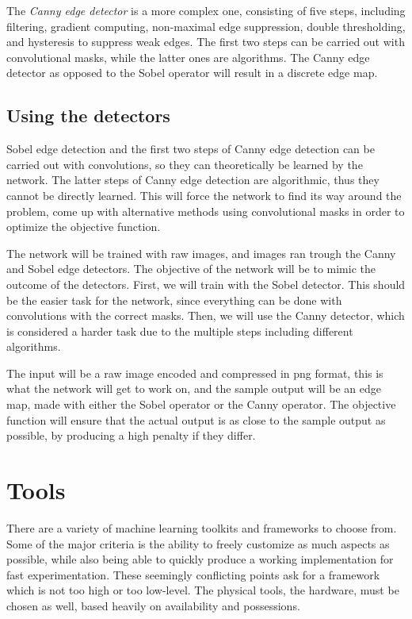 \documentclass[12pt]{report}
\begin{document}
The \textit{Canny edge detector} \cite{canny} is a more complex one, consisting of five steps, including filtering, gradient computing, non-maximal edge suppression, double thresholding, and hysteresis to suppress weak edges. The first two steps can be carried out with convolutional masks, while the latter ones are algorithms. The Canny edge detector as opposed to the Sobel operator will result in a discrete edge map.
\subsection{Using the detectors}
Sobel edge detection and the first two steps of Canny edge detection can be carried out with convolutions, so they can theoretically be learned by the network. The latter steps of Canny edge detection are algorithmic, thus they cannot be directly learned.
This will force the network to find its way around the problem, come up with alternative methods using convolutional masks in order to optimize the objective function.

The network will be trained with raw images, and images ran trough the Canny and Sobel edge detectors. The objective of the network will be to mimic the outcome of the detectors. First, we will train with the Sobel detector. This should be the easier task for the network, since everything can be done with convolutions with the correct masks. Then, we will use the Canny detector, which is considered a harder task due to the multiple steps including different algorithms.

The input will be a raw image encoded and compressed in png format, this is what the network will get to work on, and the sample output will be an edge map, made with either the Sobel operator or the Canny operator. The objective function will ensure that the actual output is as close to the sample output as possible, by producing a high penalty if they differ.
\section{Tools}
There are a variety of machine learning toolkits and frameworks to choose from. Some of the major criteria is the ability to freely customize as much aspects as possible, while also being able to quickly produce a working implementation for fast experimentation. These seemingly conflicting points ask for a framework which is not too high or too low-level. The physical tools, the hardware, must be chosen as well, based heavily on availability and possessions.
\end{document}
